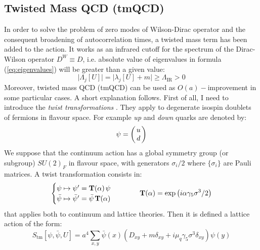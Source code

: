 \documentclass[english, LaM, oneside, noexaminfo]{sapthesis}
\begin{document}
\subsection{Twisted Mass QCD (tmQCD)}\label{sec:tmLQCD}
\noindent
In order to solve the problem of zero modes of Wilson-Dirac operator and the consequent broadening of autocorrelation times, a twisted mass term has been added to the action.
It works as an infrared cutoff for the spectrum of the Dirac-Wilson operator $D^W \equiv D$, i.e. absolute value of eigenvalues in formula (\ref{eq:eigenvalues}) will be greater than a given value:
$$\Big| \Lambda_j [U] \Big| = \Big| \lambda_j[U]+m \Big| \ge \Lambda_\text{IR} > 0 $$
Moreover, twisted mass QCD (tmQCD) can be used as $O(a)-$improvement in some particular cases.
A short explanation follows.
\newline
First of all, I need to introduce the \textit{twist transformations} \cite{tmLQCD}.
They apply to degenerate isospin doublets of fermions in flavour space.
For example \textit{up} and \textit{down} quarks are denoted by:
\begin{equation*}
    \psi =
    \begin{pmatrix}
        \hspace*{0.5mm}u\hspace*{0.5mm} \\ \hspace*{0.5mm}d\hspace*{0.5mm}
    \end{pmatrix}
\end{equation*}
We suppose that the continuum action has a global symmetry group (or subgroup) $SU(2)_F$ in flavour space, with generators $\sigma_i/2$ where $\{\sigma_i\}$ are Pauli matrices.
A twist transformation consists in:
\begin{equation}\label{eq:twist}
    \begin{cases}
        \psi \mapsto \psi' = \mathbf{T}(\alpha) \hspace*{0.5mm} \psi \\
        \bar \psi \mapsto \bar \psi' = \bar \psi \hspace*{0.5mm} \mathbf{T}(\alpha) 
    \end{cases}
    \hspace*{1cm}
    \mathbf{T}(\alpha) = \text{exp}\left(i\alpha \gamma_5 \sigma^3/2\right)
\end{equation}
that applies both to continuum and lattice theories.
Then it is defined a lattice action of the form:
\begin{equation}\label{eq:tmQCD-action}
    S_\text{tm}[\psi,\bar \psi, U] = a^4 \sum_{x,y} \bar \psi(x) \left( D_{xy} + m \delta_{xy} + i \mu_q \gamma_5 \sigma^3 \delta_{xy} \right) \psi (y)
\end{equation}
\end{document}
